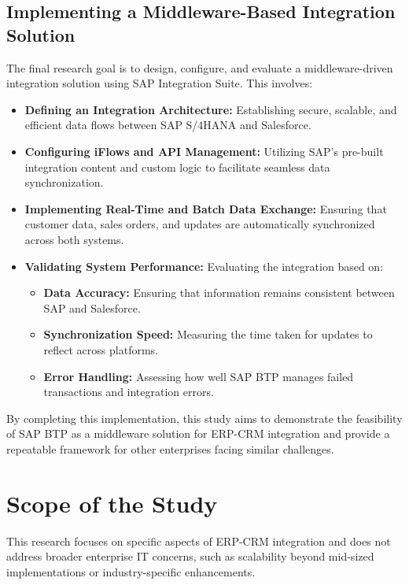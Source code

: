 \subsection{Implementing a Middleware-Based Integration Solution}
The final research goal is to design, configure, and evaluate a middleware-driven integration solution using SAP Integration Suite. This involves:

\begin{itemize}
    \item \textbf{Defining an Integration Architecture:} Establishing secure, scalable, and efficient data flows between SAP S/4HANA and Salesforce.
    \item \textbf{Configuring iFlows and API Management:} Utilizing SAP’s pre-built integration content and custom logic to facilitate seamless data synchronization.
    \item \textbf{Implementing Real-Time and Batch Data Exchange:} Ensuring that customer data, sales orders, and updates are automatically synchronized across both systems.
    \item \textbf{Validating System Performance:} Evaluating the integration based on:
    \begin{itemize}
        \item \textbf{Data Accuracy:} Ensuring that information remains consistent between SAP and Salesforce.
        \item \textbf{Synchronization Speed:} Measuring the time taken for updates to reflect across platforms.
        \item \textbf{Error Handling:} Assessing how well SAP BTP manages failed transactions and integration errors.
    \end{itemize}
\end{itemize}

By completing this implementation, this study aims to demonstrate the feasibility of SAP BTP as a middleware solution for ERP-CRM integration and provide a repeatable framework for other enterprises facing similar challenges.


\section{Scope of the Study}

This research focuses on specific aspects of ERP-CRM integration and does not address broader enterprise IT concerns, such as scalability beyond mid-sized implementations or industry-specific enhancements.

